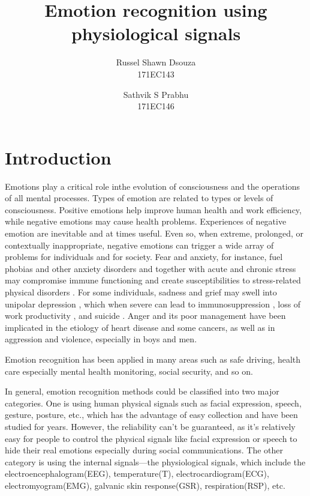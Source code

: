 \documentclass[11pt]{article}
\title{\textbf{Emotion recognition using physiological signals}}
\author{
  Russel Shawn Dsouza\\
  171EC143
  \and
  Sathvik S Prabhu\\
  171EC146
}
\date{}
\theoremstyle{definition}
\begin{document}
  \maketitle

  \section{Introduction}
    Emotions play a critical role inthe evolution of consciousness and the operations of all mental processes. Types of emotion are related to types or levels of consciousness\cite{izard_emotion_2009}.
    Positive emotions help improve human health and work efficiency, while negative emotions may cause health problems.
    Experiences of negative emotion are inevitable and at times useful. Even so, when extreme, prolonged, or contextually inappropriate, negative emotions can trigger a wide array of problems for individuals and for society. 
    Fear and anxiety, for instance, fuel phobias and other anxiety disorders \cite{ohman_automatic_1993} and together with acute and chronic stress may compromise immune functioning and create susceptibilities to stress-related physical disorders \cite{oleary_stress_1990}. 
    For some individuals, sadness and grief may swell into unipolar depression \cite{nolen-hoeksema_response_1993}, which when severe can lead to immunosuppression \cite{oleary_stress_1990}, loss of work productivity \cite{coryell_enduring_1993}, and suicide \cite{chen_lifetime_1996}. 
    Anger and its poor management have been implicated in the etiology of heart disease\cite{barefoot_hostility_1983, fredrickson_hostility_2000, scheier_person_1995} and some cancers\cite{eysenck_cancer_1994, greer_psychological_1975}, as well as in aggression and violence, especially in boys and men\cite{buss_evolution_2016, lemerise_development_2008}.

    Emotion recognition has been applied in many areas such as safe driving\cite{de_nadai_enhancing_2016}, health care\cite{guo_pervasive_2013} especially mental health monitoring\cite{verschuere_psychopathy_2006}, social security\cite{noauthor_facial_nodate}, and so on. 

    In general, emotion recognition methods could be classified into two major categories. 
    One is using human physical signals such as facial expression, speech, gesture, posture, etc., which has the advantage of easy collection and have been studied for years. 
    However, the reliability can’t be guaranteed, as it’s relatively easy for people to control the physical signals like facial expression or speech to hide their real emotions especially during social communications.
    The other category is using the internal signals—the physiological signals, which include the electroencephalogram(EEG), temperature(T), electrocardiogram(ECG), electromyogram(EMG), galvanic skin response(GSR), respiration(RSP), etc. 
\end{document}
